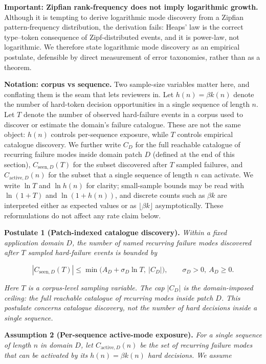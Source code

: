 \documentclass[
]{article}
\begin{document}
\textbf{Important: Zipfian rank-frequency does not imply logarithmic
growth.} Although it is tempting to derive logarithmic mode discovery
from a Zipfian pattern-frequency distribution, the derivation fails:
Heaps' law is the correct type--token consequence of Zipf-distributed
events, and it is power-law, not logarithmic. We therefore state
logarithmic mode discovery as an empirical postulate, defensible by
direct measurement of error taxonomies, rather than as a theorem.

\textbf{Notation: corpus vs sequence.} Two sample-size variables matter
here, and conflating them is the seam that lets reviewers in. Let
\(h(n) = \beta k(n)\) denote the number of hard-token decision
opportunities in a single sequence of length \(n\). Let \(T\) denote the
number of observed hard-failure events in a corpus used to discover or
estimate the domain's failure catalogue. These are not the same object:
\(h(n)\) controls per-sequence exposure, while \(T\) controls empirical
catalogue discovery. We further write \(C_D\) for the full reachable
catalogue of recurring failure modes inside domain patch \(D\) (defined
at the end of this section), \(C_{\text{seen},D}(T)\) for the subset
discovered after \(T\) sampled failures, and \(C_{\text{active},D}(n)\)
for the subset that a single sequence of length \(n\) can activate. We
write \(\ln T\) and \(\ln h(n)\) for clarity; small-sample bounds may be
read with \(\ln(1 + T)\) and \(\ln(1 + h(n))\), and discrete counts such
as \(\beta k\) are interpreted either as expected values or as
\(\lfloor \beta k \rfloor\) asymptotically. These reformulations do not
affect any rate claim below.

\textbf{Postulate 1 (Patch-indexed catalogue discovery).} \emph{Within a
fixed application domain \(D\), the number of named recurring failure
modes discovered after \(T\) sampled hard-failure events is bounded by}

\[
|C_{\text{seen},D}(T)| \leq \min\bigl(A_D + \sigma_D \ln T,\ |C_D|\bigr), \qquad \sigma_D > 0,\ A_D \geq 0.
\]

\emph{Here \(T\) is a corpus-level sampling variable. The cap \(|C_D|\)
is the domain-imposed ceiling: the full reachable catalogue of recurring
modes inside patch \(D\). This postulate concerns catalogue discovery,
not the number of hard decisions inside a single sequence.}

\textbf{Assumption 2 (Per-sequence active-mode exposure).} \emph{For a
single sequence of length \(n\) in domain \(D\), let
\(C_{\text{active},D}(n)\) be the set of recurring failure modes that
can be activated by its \(h(n) = \beta k(n)\) hard decisions. We assume}
\end{document}
